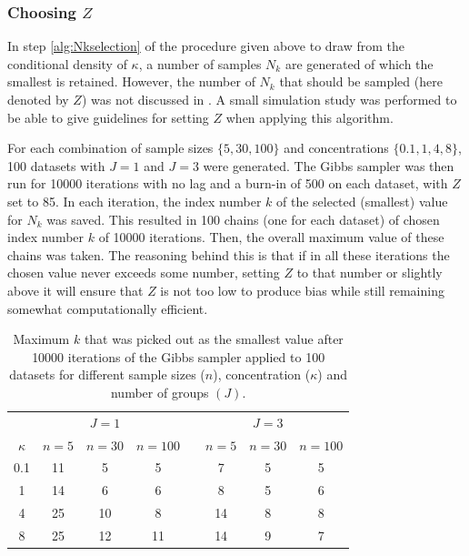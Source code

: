 \documentclass[bib]{ba/ba}
\begin{document}
\subsubsection{Choosing $Z$ \label{k}}

In step \ref{alg:Nkselection} of the procedure given above to draw from the conditional density of $\kappa$, a number of samples $N_k$ are generated of which the smallest is retained. However, the number of $N_k$  that should be sampled (here denoted by $Z$) was not discussed in \citet{damien1999fullbayes}. A small simulation study was performed to be able to give guidelines for setting $Z$ when applying this algorithm. 

For each combination of sample sizes $\{5, 30, 100\}$ and concentrations $\{0.1, 1, 4, 8\}$, 100 datasets with $J=1$ and $J=3$ were generated. The Gibbs sampler was then run for 10000 iterations with no lag and a burn-in of 500 on each dataset, with $Z$ set to 85. In each iteration, the index number $k$ of the selected (smallest) value for $N_k$ was saved. This resulted in 100 chains (one for each dataset) of chosen index number $k$ of 10000 iterations. Then, the overall maximum value of these chains was taken. The reasoning behind this is that if in all these iterations the chosen value never exceeds some number, setting $Z$ to that number or slightly above it will ensure that $Z$ is not too low to produce bias while still remaining somewhat computationally efficient. 


\begin{table}[tb]
\centering
\caption{Maximum $k$ that was picked out as the smallest value after 10000 iterations of the Gibbs sampler applied to 100 datasets for different sample sizes ($n$), concentration ($\kappa$) and number of groups $(J)$.}
\label{tab:sufficientk}
\begin{tabular}{c@{\hskip 1.0cm}cccc@{\hskip 0.7cm}ccc}
  \toprule 
  & & $J=1$ & & & & $J=3$ & \\ 
   \cmidrule{2-4}
  $\kappa$ & $n=5$ & $n=30$ & $n=100$ & & $n=5$ & $n=30$ & $n=100$ \\ 
  \hline 
 0.1 & 11 & 5 & 5 &  & 7 & 5 & 5 \\ 
  1 & 14 & 6 & 6 &  & 8 & 5 & 6 \\ 
  4 & 25 & 10 & 8 &  & 14 & 8 & 8 \\ 
  8 & 25 & 12 & 11 &  & 14 & 9 & 7 \\ 
   \bottomrule 
\end{tabular}
\end{table}
\end{document}

